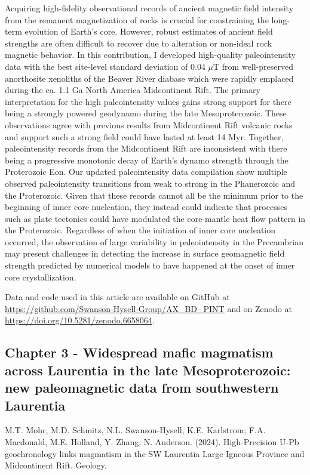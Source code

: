 \documentclass{ucbthesis}
\begin{document}
\begin{frontmatter}
Acquiring high-fidelity observational records of ancient magnetic field intensity from the remanent magnetization of rocks is crucial for constraining the long-term evolution of Earth’s core. However, robust estimates of ancient field strengths are often difficult to recover due to alteration or non-ideal rock magnetic behavior. In this contribution, I developed high-quality paleointensity data with the best site-level standard deviation of 0.04 $\mu$T from well-preserved anorthosite xenoliths of the Beaver River diabase which were rapidly emplaced during the ca. 1.1 Ga North America Midcontinent Rift. The primary interpretation for the high paleointensity values gains strong support for there being a strongly powered geodynamo during the late Mesoproterozoic. These observations agree with previous results from Midcontinent Rift volcanic rocks and support such a strong field could have lasted at least 14 Myr. Together, paleointensity records from the Midcontinent Rift are inconsistent with there being a progressive monotonic decay of Earth’s dynamo strength through the Proterozoic Eon.
Our updated paleointensity data compilation show multiple observed paleointensity transitions from weak to strong in the Phanerozoic and the Proterozoic. Given that these records cannot all be the minimum prior to the beginning of inner core nucleation, they instead could indicate that processes such as plate tectonics could have modulated the core-mantle heat flow pattern in the Proterozoic. Regardless of when the initiation of inner core nucleation occurred, the observation of large variability in paleointensity in the Precambrian may present challenges in detecting the increase in surface geomagnetic field strength predicted by numerical models to have happened at the onset of inner core crystallization.

Data and code used in this article are available on GitHub at \url{https://github.com/Swanson-Hysell-Group/AX_BD_PINT} and on Zenodo at \url{https://doi.org/10.5281/zenodo.6658064}. 

\subsection{Chapter 3 - Widespread mafic magmatism across Laurentia in the late Mesoproterozoic: new paleomagnetic data from southwestern Laurentia}

M.T. Mohr, M.D. Schmitz, N.L. Swanson-Hysell, K.E. Karlstrom; F.A. Macdonald, M.E. Holland, Y. Zhang, N. Anderson. (2024). High-Precision U-Pb geochronology links magmatism in the SW Laurentia Large Igneous Province and Midcontinent Rift. Geology. 


\end{frontmatter}
\end{document}
